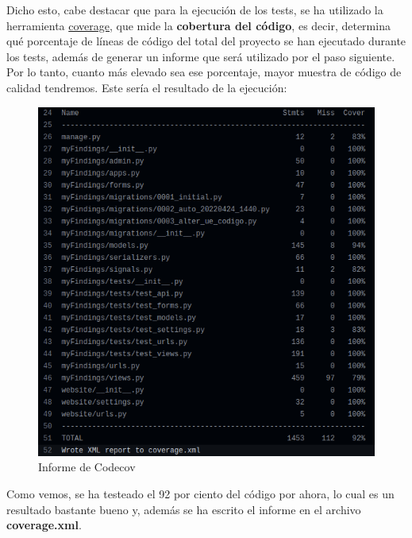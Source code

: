 \begin{enumerate}
\begin{enumerate}
\begin{enumerate}
                        Dicho esto, cabe destacar que para la ejecución de los tests, se ha
                        utilizado la herramienta \href{https://pypi.org/project/coverage/}
                        {coverage}, que mide la \textbf{cobertura del código}, es decir,
                        determina qué porcentaje de líneas de código del total del proyecto
                        se han ejecutado durante los tests, además de generar un informe que
                        será utilizado por el paso siguiente. Por lo tanto, cuanto más
                        elevado sea ese porcentaje, mayor muestra de código de calidad
                        tendremos. Este sería el resultado de la ejecución:

                                \begin{figure}[H]
                                    \centering
                                    \includegraphics[scale=0.40]{imagenes/codecov-report.png}
                                    \caption{Informe de Codecov}
                                    \label{fig:codecov-report}
                                \end{figure}
                        
                        Como vemos, se ha testeado el 92 por ciento del código por ahora, lo
                        cual es un resultado bastante bueno y, además se ha escrito el
                        informe en el archivo \textbf{coverage.xml}.
                        

\end{enumerate}
\end{enumerate}
\end{enumerate}
